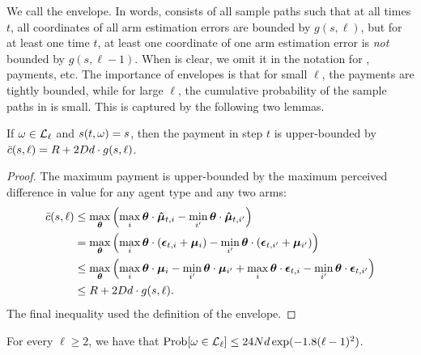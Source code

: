 We call \Env{\ell} the \Kth{\ell} envelope.
In words, \Env{\ell} consists of all sample paths such that at all times
$t$, all coordinates of all arm estimation errors are bounded by
$g(s, \ell)$,
but for at least one time $t$, at least one coordinate of one arm
estimation error is \emph{not} bounded by $g(s, \ell-1)$.
When \SP is clear, we omit it in the notation for
, payments, etc.
The importance of envelopes is that for small $\ell$, the payments are
tightly bounded, while for large $\ell$, the cumulative probability of
the sample paths in \Env{\ell} is small.
This is captured by the following two lemmas.

\begin{lemma} \label{lem:sample-path-payment}
If $\omega \in {\mathcal L}_{\ell}$ and $s(t,\omega) = s$, then
the payment in step $t$ is upper-bounded by
$\bar{c} (s,\ell) = R + 2 D d \cdot g(s,\ell)$.
\end{lemma}

\begin{proof}
The maximum payment is upper-bounded by the maximum perceived
difference in value for any agent type and any two arms:
\begin{align*}
\bar{c} (s, \ell) & \leq 
\max_{\bm{\theta}} \left(  \max_{i} \bm{\theta} \cdot \bm{\hat{\mu}}_{t,i}
                 - \min_{i'} \bm{\theta} \cdot \bm{\hat{\mu}}_{t,i'} \right) \\
& = \max_{\bm{\theta}} \left( \max_{i}\bm{\theta} \cdot (\bm{\epsilon}_{t,i}+\bm{\mu}_{i})
                    - \min_{i'}\bm{\theta} \cdot (\bm{\epsilon}_{t,i'}+\bm{\mu}_{i'}) \right) \\
& \leq \max_{\bm{\theta}} \left(  \max_{i} \bm{\theta} \cdot \bm{\mu}_{i}
                        - \min_{i'} \bm{\theta} \cdot \bm{\mu}_{i'}
                        + \max_{i} \bm{\theta} \cdot \bm{\epsilon}_{t,i}
                        - \min_{i'} \bm{\theta} \cdot \bm{\epsilon}_{t,i'} \right) \\
& \leq R + 2 D d \cdot g(s,\ell). 
\end{align*}
The final inequality used the definition of the envelope.
\end{proof}

\begin{lemma} \label{lem:envelope-probability}
For every $\ell \geq 2$, we have that
$\Prob{\SP \in \Env{\ell}} \leq 24 \ARMNUM d\exp(-1.8(\ell-1)^2)$. 
\end{lemma}

